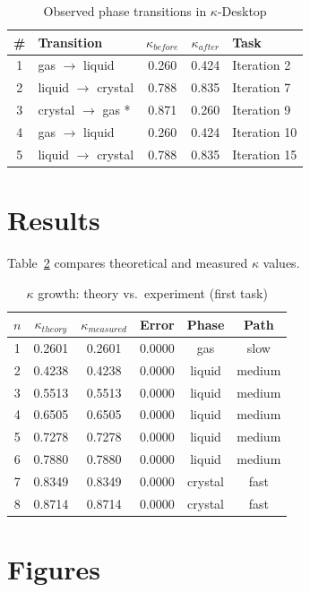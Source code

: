 \documentclass{article}
\begin{document}
\begin{table}[h]
\centering
\caption{Observed phase transitions in $\kappa$-Desktop}
\begin{tabular}{clccl}
\hline
\# & Transition & $\kappa_{before}$ & $\kappa_{after}$ & Task \\
\hline
1 & gas $\to$ liquid & 0.260 & 0.424 & Iteration 2 \\
2 & liquid $\to$ crystal & 0.788 & 0.835 & Iteration 7 \\
3 & crystal $\to$ gas * & 0.871 & 0.260 & Iteration 9 \\
4 & gas $\to$ liquid & 0.260 & 0.424 & Iteration 10 \\
5 & liquid $\to$ crystal & 0.788 & 0.835 & Iteration 15 \\
\hline
\end{tabular}
\label{tab:transitions}
\end{table}

\section{Results}
Table~\ref{tab:kappa_growth} compares theoretical and measured $\kappa$ values.

\begin{table}[h]
\centering
\caption{$\kappa$ growth: theory vs.\ experiment (first task)}
\begin{tabular}{cccccc}
\hline
$n$ & $\kappa_{theory}$ & $\kappa_{measured}$ & Error & Phase & Path \\
\hline
1 & 0.2601 & 0.2601 & 0.0000 & gas & slow \\
2 & 0.4238 & 0.4238 & 0.0000 & liquid & medium \\
3 & 0.5513 & 0.5513 & 0.0000 & liquid & medium \\
4 & 0.6505 & 0.6505 & 0.0000 & liquid & medium \\
5 & 0.7278 & 0.7278 & 0.0000 & liquid & medium \\
6 & 0.7880 & 0.7880 & 0.0000 & liquid & medium \\
7 & 0.8349 & 0.8349 & 0.0000 & crystal & fast \\
8 & 0.8714 & 0.8714 & 0.0000 & crystal & fast \\
\hline
\end{tabular}
\label{tab:kappa_growth}
\end{table}

\section{Figures}
\end{document}
